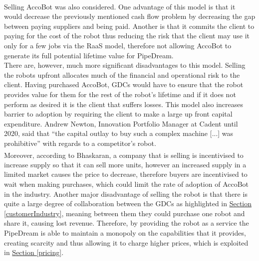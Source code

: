 \documentclass[11pt]{article}		%
\newcommand{\supercite}[1]{\textsuperscript{\cite{#1}}}		%
\newcommand{\sectref}[1]{\hyperref[#1]{Section \ref*{#1}}}     %
\begin{document}
            \\ 
            \hspace*{2ex}
            Selling AccoBot was also considered.
            One advantage of this model is that it would decrease the previously mentioned cash flow problem by decreasing the gap between paying suppliers and being paid. Another is that it commits the client to paying for the cost of the robot thus reducing the risk that the client may use it only for a few jobs via the RaaS model, therefore not allowing AccoBot to generate its full potential lifetime value for PipeDream.
            \\
            \hspace*{2ex}There are, however, much more significant disadvantages to this model. Selling the robots upfront allocates much of the financial and operational risk to the client. Having purchased AccoBot, GDCs would have to ensure that the robot provides value for them for the rest of the robot’s lifetime and if it does not perform as desired it is the client that suffers losses. This model also increases barrier to adoption by requiring the client to make a large up front capital expenditure. Andrew Newton, Innovation Portfolio Manager at Cadent until 2020, said that “the capital outlay to buy such a complex machine [...] was prohibitive” with regards to a competitor’s robot. 
            \\
            \hspace*{2ex}Moreover, according to Bhaskaran\supercite{leasing_strategy}, a company that is selling is incentivised to increase supply so that it can sell more units, however an increased supply in a limited market causes the price to decrease, therefore buyers are incentivised to wait when making purchases, which could limit the rate of adoption of AccoBot in the industry. Another major disadvantage of selling the robot is that there is quite a large degree of collaboration between the GDCs as highlighted in \sectref{customerIndustry}, meaning between them they could purchase one robot and share it, causing lost revenue. Therefore, by providing the robot as a service the PipeDream is able to maintain a monopoly on the capabilities that it provides, creating scarcity and thus allowing it to charge higher prices, which is exploited in \sectref{pricing}.
\end{document}
